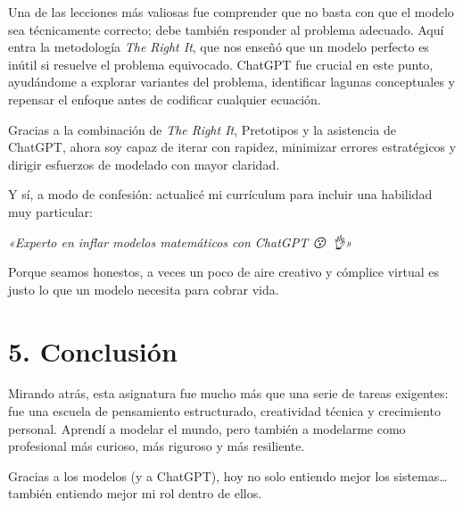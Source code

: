 \documentclass[12pt]{article}
\begin{document}
Una de las lecciones más valiosas fue comprender que no basta con que el modelo sea técnicamente correcto; debe también responder al problema adecuado. Aquí entra la metodología \textit{The Right It}, que nos enseñó que un modelo perfecto es inútil si resuelve el problema equivocado. ChatGPT fue crucial en este punto, ayudándome a explorar variantes del problema, identificar lagunas conceptuales y repensar el enfoque antes de codificar cualquier ecuación.

Gracias a la combinación de \textit{The Right It}, Pretotipos y la asistencia de ChatGPT, ahora soy capaz de iterar con rapidez, minimizar errores estratégicos y dirigir esfuerzos de modelado con mayor claridad.

Y sí, a modo de confesión: actualicé mi currículum para incluir una habilidad muy particular:

\begin{center}
\textit{«Experto en inflar modelos matemáticos con ChatGPT 😗💨🎈👌»}
\end{center}

Porque seamos honestos, a veces un poco de aire creativo y cómplice virtual es justo lo que un modelo necesita para cobrar vida.

\section*{5. Conclusión}

Mirando atrás, esta asignatura fue mucho más que una serie de tareas exigentes: fue una escuela de pensamiento estructurado, creatividad técnica y crecimiento personal. Aprendí a modelar el mundo, pero también a modelarme como profesional más curioso, más riguroso y más resiliente.

Gracias a los modelos (y a ChatGPT), hoy no solo entiendo mejor los sistemas… también entiendo mejor mi rol dentro de ellos.
\end{document}
